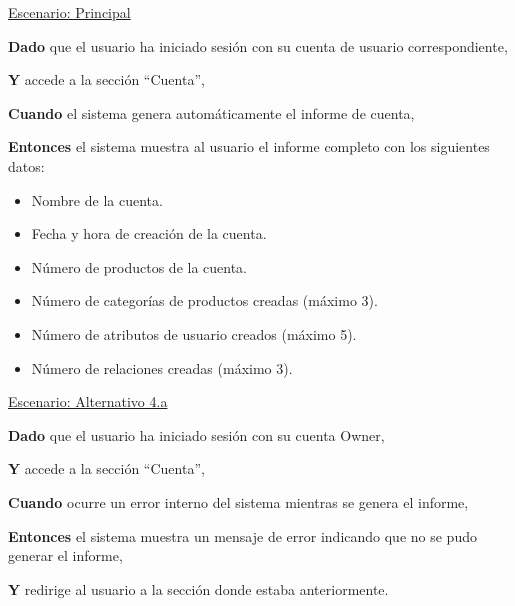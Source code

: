 \underline{Escenario: Principal}\par
\vspace{0.15cm} 
\textbf{Dado} que el usuario ha iniciado sesión con su cuenta de usuario correspondiente,\par 
\textbf{Y} accede a la sección \enquote{Cuenta},\par 
\textbf{Cuando} el sistema genera automáticamente el informe de cuenta,\par 
\textbf{Entonces} el sistema muestra al usuario el informe completo con los siguientes datos:\par 
\begin{itemize} 
    \item Nombre de la cuenta. 
    \item Fecha y hora de creación de la cuenta. 
    \item Número de productos de la cuenta. 
    \item Número de categorías de productos creadas (máximo 3). 
    \item Número de atributos de usuario creados (máximo 5). 
    \item Número de relaciones creadas (máximo 3). 
\end{itemize} 
\vspace{0.20cm}


\underline{Escenario: Alternativo 4.a}\par
\vspace{0.15cm} 
\textbf{Dado} que el usuario ha iniciado sesión con su cuenta Owner,\par 
\textbf{Y} accede a la sección \enquote{Cuenta},\par 
\textbf{Cuando} ocurre un error interno del sistema mientras se genera el informe,\par 
\textbf{Entonces} el sistema muestra un mensaje de error indicando que no se pudo generar el informe,\par 
\textbf{Y} redirige al usuario a la sección donde estaba anteriormente.\par 
\vspace{0.20cm}

\newpage %

